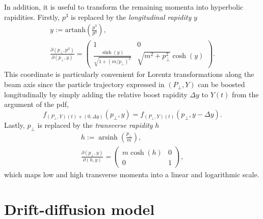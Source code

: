 \documentclass[a4paper,12pt]{book}
\begin{document}
In addition, it is useful to transform the remaining momenta into hyperbolic rapidities. Firstly, $p^3$ is replaced by the \textit{longitudinal rapidity} $y$
\begin{subequations}
\begin{gather}
    y:=\text{artanh}\left(\frac{p^3}{p^0}\right), \\
    \frac{\partial\left(p_{\perp}, p^3\right)}{\partial\left(p_{\perp}, y\right)}=\left(\begin{array}{cc}
1  & 0 \\
\frac{\sinh (y)}{\sqrt{1+\left(m  / p_{\perp}\right)^2}}  & \sqrt{m ^2+p_{\perp}^2} \cosh (y)
\end{array}\right).
\end{gather}
\end{subequations}
This coordinate is particularly convenient for Lorentz transformations along the beam axis since the particle trajectory expressed in $\left(P_{\perp}, Y\right)$ can be boosted longitudinally by simply adding the relative boost rapidity $\Delta y$ to $Y(t)$ from the argument of the \acrshort{pdf},
\begin{equation}
f_{\left(P_{\perp}, Y\right)(t)+(0,\Delta y)}\left(p_{\perp},  y\right)=f_{\left(P_{\perp},Y\right)(t)}\left(p_{\perp}, y-\Delta y\right) .
\end{equation}
Lastly, $p_\perp$ is replaced by the \textit{transverse rapidity} $h$
\begin{subequations}
\begin{gather}
        h:=\operatorname{arsinh}\left(\frac{p_{\perp}}{m}\right), \\
        \frac{\partial\left(p_{\perp}, y\right)}{\partial(h, y)}=\left(\begin{array}{cc}
m  \cosh (h) & 0 \\
0  & 1
\end{array}\right),
\end{gather}
\end{subequations}
which maps low and high transverse momenta into a linear and logarithmic scale. 

\section{Drift-diffusion model}
\end{document}
